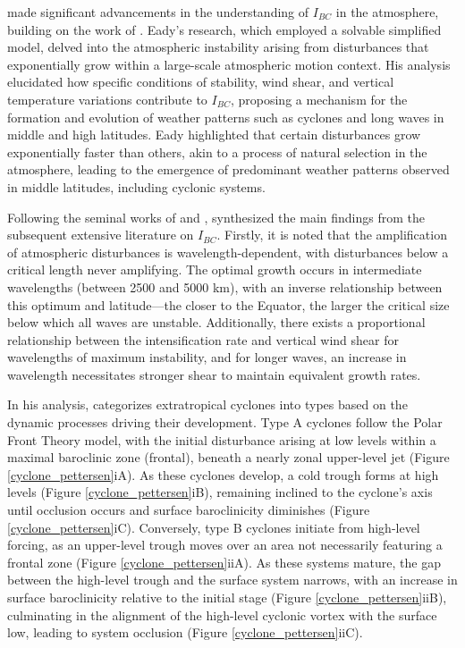 \citet{eady1949long} made significant advancements in the understanding of \(I_{BC}\) in the atmosphere, building on the work of \citet{charney1947dynamics}. Eady's research, which employed a solvable simplified model, delved into the atmospheric instability arising from disturbances that exponentially grow within a large-scale atmospheric motion context. His analysis elucidated how specific conditions of stability, wind shear, and vertical temperature variations contribute to \(I_{BC}\), proposing a mechanism for the formation and evolution of weather patterns such as cyclones and long waves in middle and high latitudes. Eady highlighted that certain disturbances grow exponentially faster than others, akin to a process of natural selection in the atmosphere, leading to the emergence of predominant weather patterns observed in middle latitudes, including cyclonic systems.

Following the seminal works of \citet{charney1947dynamics} and \citet{eady1949long}, \citet{palmen1969atmospheric} synthesized the main findings from the subsequent extensive literature on \(I_{BC}\). Firstly, it is noted that the amplification of atmospheric disturbances is wavelength-dependent, with disturbances below a critical length never amplifying. The optimal growth occurs in intermediate wavelengths (between 2500 and 5000 km), with an inverse relationship between this optimum and latitude—the closer to the Equator, the larger the critical size below which all waves are unstable. Additionally, there exists a proportional relationship between the intensification rate and vertical wind shear for wavelengths of maximum instability, and for longer waves, an increase in wavelength necessitates stronger shear to maintain equivalent growth rates.

In his analysis, \citet{petterssen1971development} categorizes extratropical cyclones into types based on the dynamic processes driving their development. Type A cyclones follow the Polar Front Theory model, with the initial disturbance arising at low levels within a maximal baroclinic zone (frontal), beneath a nearly zonal upper-level jet (Figure \ref{cyclone_pettersen}iA). As these cyclones develop, a cold trough forms at high levels (Figure \ref{cyclone_pettersen}iB), remaining inclined to the cyclone's axis until occlusion occurs and surface baroclinicity diminishes (Figure \ref{cyclone_pettersen}iC). Conversely, type B cyclones initiate from high-level forcing, as an upper-level trough moves over an area not necessarily featuring a frontal zone (Figure \ref{cyclone_pettersen}iiA). As these systems mature, the gap between the high-level trough and the surface system narrows, with an increase in surface baroclinicity relative to the initial stage (Figure \ref{cyclone_pettersen}iiB), culminating in the alignment of the high-level cyclonic vortex with the surface low, leading to system occlusion (Figure \ref{cyclone_pettersen}iiC).

